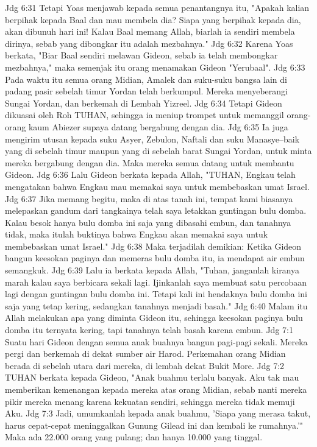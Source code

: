 Jdg 6:31  Tetapi Yoas menjawab kepada semua penantangnya itu, "Apakah kalian berpihak kepada Baal dan mau membela dia? Siapa yang berpihak kepada dia, akan dibunuh hari ini! Kalau Baal memang Allah, biarlah ia sendiri membela dirinya, sebab yang dibongkar itu adalah mezbahnya."
Jdg 6:32  Karena Yoas berkata, "Biar Baal sendiri melawan Gideon, sebab ia telah membongkar mezbahnya," maka semenjak itu orang menamakan Gideon "Yerubaal".
Jdg 6:33  Pada waktu itu semua orang Midian, Amalek dan suku-suku bangsa lain di padang pasir sebelah timur Yordan telah berkumpul. Mereka menyeberangi Sungai Yordan, dan berkemah di Lembah Yizreel.
Jdg 6:34  Tetapi Gideon dikuasai oleh Roh TUHAN, sehingga ia meniup trompet untuk memanggil orang-orang kaum Abiezer supaya datang bergabung dengan dia.
Jdg 6:35  Ia juga mengirim utusan kepada suku Asyer, Zebulon, Naftali dan suku Manasye--baik yang di sebelah timur maupun yang di sebelah barat Sungai Yordan, untuk minta mereka bergabung dengan dia. Maka mereka semua datang untuk membantu Gideon.
Jdg 6:36  Lalu Gideon berkata kepada Allah, "TUHAN, Engkau telah mengatakan bahwa Engkau mau memakai saya untuk membebaskan umat Israel.
Jdg 6:37  Jika memang begitu, maka di atas tanah ini, tempat kami biasanya melepaskan gandum dari tangkainya telah saya letakkan guntingan bulu domba. Kalau besok hanya bulu domba ini saja yang dibasahi embun, dan tanahnya tidak, maka itulah buktinya bahwa Engkau akan memakai saya untuk membebaskan umat Israel."
Jdg 6:38  Maka terjadilah demikian: Ketika Gideon bangun keesokan paginya dan memeras bulu domba itu, ia mendapat air embun semangkuk.
Jdg 6:39  Lalu ia berkata kepada Allah, "Tuhan, janganlah kiranya marah kalau saya berbicara sekali lagi. Ijinkanlah saya membuat satu percobaan lagi dengan guntingan bulu domba ini. Tetapi kali ini hendaknya bulu domba ini saja yang tetap kering, sedangkan tanahnya menjadi basah."
Jdg 6:40  Malam itu Allah melakukan apa yang diminta Gideon itu, sehingga keesokan paginya bulu domba itu ternyata kering, tapi tanahnya telah basah karena embun.
Jdg 7:1  Suatu hari Gideon dengan semua anak buahnya bangun pagi-pagi sekali. Mereka pergi dan berkemah di dekat sumber air Harod. Perkemahan orang Midian berada di sebelah utara dari mereka, di lembah dekat Bukit More.
Jdg 7:2  TUHAN berkata kepada Gideon, "Anak buahmu terlalu banyak. Aku tak mau memberikan kemenangan kepada mereka atas orang Midian, sebab nanti mereka pikir mereka menang karena kekuatan sendiri, sehingga mereka tidak memuji Aku.
Jdg 7:3  Jadi, umumkanlah kepada anak buahmu, 'Siapa yang merasa takut, harus cepat-cepat meninggalkan Gunung Gilead ini dan kembali ke rumahnya.'" Maka ada 22.000 orang yang pulang; dan hanya 10.000 yang tinggal.
